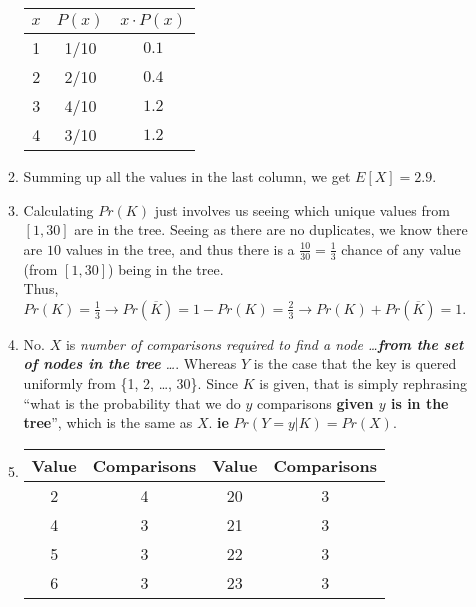 \documentclass{article}
\begin{document}
\begin{enumerate}
\begin{enumerate}[label=\arabic*.]
                    \begin{tabular}{c|c|c}
                        $x$ & $P(x)$ & $x \cdot P(x)$ \\
                        \hline
                        1   & 1/10   & $0.1$          \\
                        2   & 2/10   & $0.4$          \\
                        3   & 4/10   & $1.2$          \\
                        4   & 3/10   & $1.2$
                    \end{tabular}
              \item Summing up all the values in the last column, we get $E[X] = 2.9$.
              \item Calculating $Pr(K)$ just involves us seeing which unique values from $[1, 30]$ are in the tree.
                    Seeing as there are no duplicates, we know there are \(10\) values in the tree, and thus
                    there is a \(\frac{10}{30} = \frac{1}{3}\) chance of any value (from \([1, 30]\)) being in the tree. \\
                    Thus, \(Pr(K) = \frac{1}{3} \rightarrow Pr(\overline{K}) = 1 - Pr(K) = \frac{2}{3} \rightarrow Pr(K) + Pr(\overline{K}) = 1\).
              \item No. $X$ is \textit{number of comparisons required to find a node \dots \textbf{from the set of nodes in the tree} \dots}.
                    Whereas $Y$ is the case that the key is quered uniformly from \{1, 2, \dots, 30\}. Since $K$ is given, that is simply rephrasing
                    ``what is the probability that we do $y$ comparisons \textbf{given $y$ is in the tree}'', which is the same as $X$. \textbf{ie} \(Pr(Y = y | K) = Pr(X)\).
              \item
                    \begin{multicols}{2}
                        \begin{tabular}{c|c||c|c}
                            Value & Comparisons & Value & Comparisons \\
                            \hline
                            2     & 4           & 20    & 3           \\
                            4     & 3           & 21    & 3           \\
                            5     & 3           & 22    & 3           \\
                            6     & 3           & 23    & 3           \\

\end{tabular}
\end{multicols}
\end{enumerate}
\end{enumerate}
\end{document}
